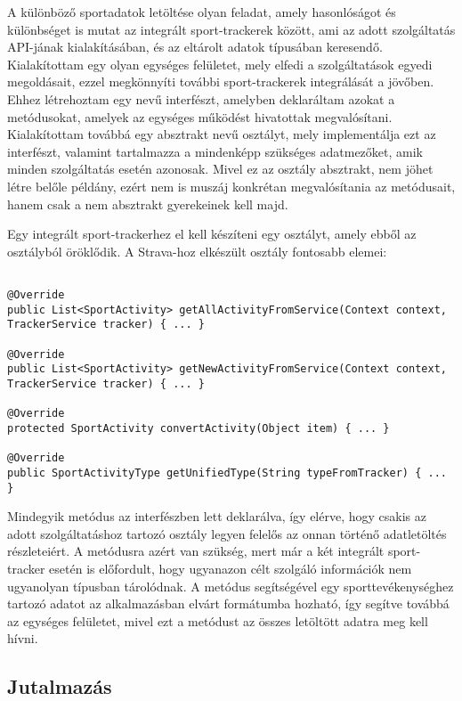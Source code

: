 A különböző sportadatok letöltése olyan feladat, amely hasonlóságot és különbséget is mutat az integrált sport-trackerek között, ami az adott szolgáltatás API-jának kialakításában, és az eltárolt adatok típusában keresendő. 
Kialakítottam egy olyan egységes felületet, mely elfedi a szolgáltatások egyedi megoldásait, ezzel megkönnyíti további sport-trackerek integrálását a jövőben. 
Ehhez létrehoztam egy  nevű interfészt, amelyben deklaráltam azokat a metódusokat, amelyek az egységes működést hivatottak megvalósítani. 
Kialakítottam továbbá egy absztrakt   nevű osztályt, mely implementálja ezt az interfészt, valamint tartalmazza a mindenképp szükséges adatmezőket, amik minden szolgáltatás esetén azonosak. 
Mivel ez az osztály absztrakt, nem jöhet létre belőle példány, ezért nem is muszáj konkrétan megvalósítania az  metódusait, hanem csak a nem absztrakt gyerekeinek kell majd. 

Egy integrált sport-trackerhez el kell készíteni egy osztályt, amely ebből az osztályból öröklődik. 
A Strava-hoz elkészült osztály fontosabb elemei:

\begin{lstlisting}

@Override
public List<SportActivity> getAllActivityFromService(Context context, TrackerService tracker) { ... }

@Override
public List<SportActivity> getNewActivityFromService(Context context, TrackerService tracker) { ... }

@Override
protected SportActivity convertActivity(Object item) { ... }

@Override
public SportActivityType getUnifiedType(String typeFromTracker) { ... }

\end{lstlisting}

Mindegyik metódus az interfészben lett deklarálva, így elérve, hogy csakis az adott szolgáltatáshoz tartozó osztály legyen felelős az onnan történő adatletöltés részleteiért. 
A  metódusra azért van szükség, mert már a két integrált sport-tracker esetén is előfordult, hogy ugyanazon célt szolgáló információk nem ugyanolyan típusban tárolódnak. 
A metódus segítségével egy sporttevékenységhez tartozó adatot az alkalmazásban elvárt formátumba hozható, így segítve továbbá az egységes felületet, mivel ezt a metódust az összes letöltött adatra meg kell hívni. 

\subsection*{Jutalmazás}
\label{reward}

